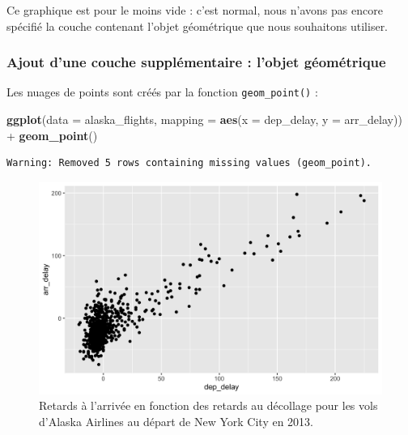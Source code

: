 \documentclass[a4paperpaper,]{article}
\newenvironment{Shaded}{\begin{snugshade}}{\end{snugshade}}
\newcommand{\DataTypeTok}[1]{\textcolor[rgb]{0.00,0.34,0.68}{#1}}
\newcommand{\KeywordTok}[1]{\textcolor[rgb]{0.12,0.11,0.11}{\textbf{#1}}}
\newcommand{\NormalTok}[1]{\textcolor[rgb]{0.12,0.11,0.11}{#1}}
\newcommand{\OperatorTok}[1]{\textcolor[rgb]{0.12,0.11,0.11}{#1}}
\newcommand{\StringTok}[1]{\textcolor[rgb]{0.75,0.01,0.01}{#1}}
\begin{document}
Ce graphique est pour le moins vide : c'est normal, nous n'avons pas encore spécifié la couche contenant l'objet géométrique que nous souhaitons utiliser.

\hypertarget{ajout-dune-couche-supplementaire-lobjet-geometrique}{%
\subsubsection{Ajout d'une couche supplémentaire : l'objet géométrique}\label{ajout-dune-couche-supplementaire-lobjet-geometrique}}

Les nuages de points sont créés par la fonction \texttt{geom\_point()} :

\begin{Shaded}
\begin{Highlighting}[]
\KeywordTok{ggplot}\NormalTok{(}\DataTypeTok{data =}\NormalTok{ alaska_flights, }\DataTypeTok{mapping =} \KeywordTok{aes}\NormalTok{(}\DataTypeTok{x =}\NormalTok{ dep_delay, }\DataTypeTok{y =}\NormalTok{ arr_delay)) }\OperatorTok{+}\StringTok{ }
\StringTok{  }\KeywordTok{geom_point}\NormalTok{()}
\end{Highlighting}
\end{Shaded}

\begin{verbatim}
Warning: Removed 5 rows containing missing values (geom_point).
\end{verbatim}

\begin{figure}[!htpb]

{\centering \includegraphics[width=0.9\linewidth]{figure/points-1} 

}

\caption{Retards à l'arrivée en fonction des retards au décollage pour les vols d'Alaska Airlines au départ de New York City en 2013.}\label{fig:points}
\end{figure}
\end{document}
